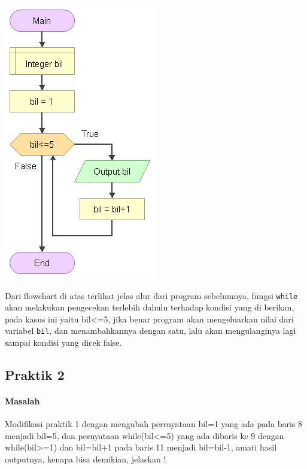 \documentclass[a4paper,12pt]{article}
\begin{document}
\begin{center}
	\includegraphics[scale=.5]{image--024}
\end{center}
Dari flowchart di atas terlihat jelas alur dari program sebelumnya, fungsi \texttt{while} akan melakukan pengecekan terlebih dahulu terhadap kondisi yang di berikan, pada kasus ini yaitu bil<=5, jika benar program akan mengeluarkan nilai dari variabel \texttt{bil}, dan menambahkannya dengan satu, lalu akan mengulanginya lagi sampai kondisi yang dicek false.

\subsection{Praktik 2}
\paragraph{Masalah\\}
Modifikasi praktik 1 dengan mengubah perrnyataan bil=1 yang ada pada baris 8
menjadi bil=5, dan pernyataan while(bil<=5) yang ada dibaris ke 9 dengan
while(bil>=1) dan bil=bil+1 pada baris 11 menjadi bil=bil-1, amati hasil outputnya,
kenapa bisa demikian, jelaskan !
\end{document}
